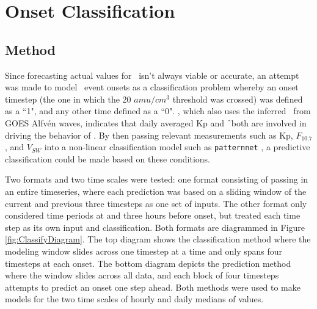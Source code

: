\chapter[Onset Classification]{Onset Classification}

\section{Method}
Since forecasting actual values for \req\ isn't always viable or accurate, an attempt was made to model \req\ event onsets as a classification problem whereby an onset timestep (the one in which the 20 $amu/cm^3$ threshold was crossed) was defined as a ``1", and any other time defined as a ``0". \cite{Denton2016}, which also uses the inferred \req\ from GOES Alfvén waves, indicates that daily averaged Kp and \f\ both are involved in driving the behavior of \req. By then passing relevant measurements such as Kp, $F_{10.7}$, and $V_{SW}$ into a non-linear classification model such as \texttt{patternnet} \citep{MATLAB:2014}, a predictive classification could be made based on these conditions. 

Two formats and two time scales were tested: one format consisting of passing in an entire timeseries, where each prediction was based on a sliding window of the current and previous three timesteps as one set of inputs. The other format only considered time periods at and three hours before onset, but treated each time step as its own input and classification. Both formats  are diagrammed in Figure \ref{fig:ClassifyDiagram}. The top diagram shows the classification method where the modeling window slides across one timestep at a time and only spans four timesteps at each onset. The bottom diagram depicts the prediction method where the window slides across all data, and each block of four timesteps attempts to predict an onset one step ahead. Both methods were used to make models for the two time scales of hourly and daily medians of values. 

